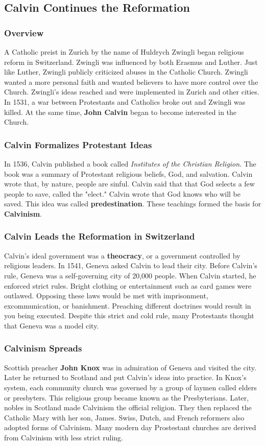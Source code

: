 \documentclass[11pt]{article}
\begin{document}
\subsection{Calvin Continues the Reformation}
\label{sec:org8e585b6}
\subsubsection{Overview}
\label{sec:org08b5d9c}
A Catholic preist in Zurich by the name of Huldrych Zwingli began religious reform in Switzerland. Zwingli was influenced by both Erasmus and Luther. Just like Luther, Zwingli publicly criticized abuses in the Catholic Church. Zwingli wanted a more personal faith and wanted believers to have more control over the Church. Zwingli's ideas reached and were implemented in Zurich and other cities. In 1531, a war between Protestants and Catholics broke out and Zwingli was killed. At the same time, \textbf{John Calvin} began to become interested in the Church.
\subsubsection{Calvin Formalizes Protestant Ideas}
\label{sec:orged681eb}
In 1536, Calvin published a book called \emph{Institutes of the Christian Religion}. The book was a summary of Protestant religious beliefs, God, and salvation. Calvin wrote that, by nature, people are sinful. Calvin said that that God selects a few people to save, called the "elect." Calvin wrote that God knows who will be saved. This idea was called \textbf{predestination}. These teachings formed the basis for \textbf{Calvinism}.
\subsubsection{Calvin Leads the Reformation in Switzerland}
\label{sec:orgef7957c}
Calvin's ideal government was a \textbf{theocracy}, or a government controlled by religious leaders. In 1541, Geneva asked Calvin to lead their city. Before Calvin's rule, Geneva was a self-governing city of 20,000 people. When Calvin started, he enforced strict rules. Bright clothing or entertainment such as card games were outlawed. Opposing these laws would be met with imprisonment, excommunication, or banishment. Preaching different doctrines would result in you being executed. Despite this strict and cold rule, many Protestants thought that Geneva was a model city.
\subsubsection{Calvinism Spreads}
\label{sec:org3afebe2}
Scottish preacher \textbf{John Knox} was in admiration of Geneva and visited the city. Later he returned to Scotland and put Calvin's ideas into practice. In Knox's system, each community church was governed by a group of laymen called elders or presbyters. This religious group became known as the Presbyterians. Later, nobles in Scotland made Calvinism the official religion. They then replaced the Catholic Mary with her son, James. Swiss, Dutch, and French reformers also adopted forms of Calvinism. Many modern day Prostestant churches are derived from Calvinism with less strict ruling.
\end{document}
